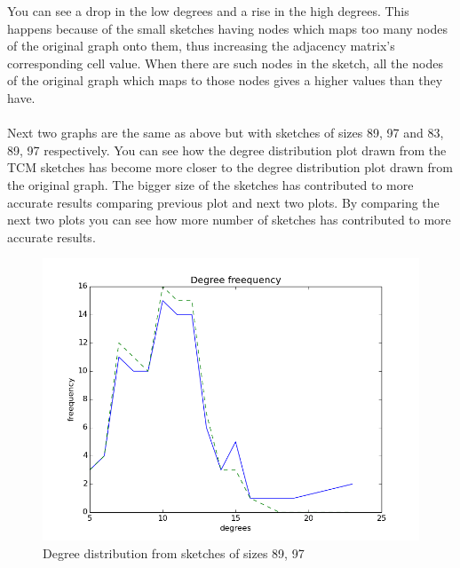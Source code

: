 \documentclass[12pt]{report}
\numberwithin{figure}{section}
\numberwithin{table}{section}
\begin{document}
You can see a drop in the low degrees and a rise in the high degrees. This happens because of the small sketches having nodes which maps too many nodes of the original graph onto them, thus increasing the adjacency matrix’s corresponding cell value. When there are such nodes in the sketch, all the nodes of the original graph which maps to those nodes gives a higher values than they have. 

\paragraph{}

Next two graphs are the same as above but with sketches  of sizes 89, 97 and 83, 89, 97 respectively. You can see how the degree distribution plot drawn from the TCM sketches has become more closer to the degree distribution plot drawn from the original graph. The bigger size of the sketches has contributed to more accurate results comparing previous plot and next two plots. By comparing the next two plots you can see how more number of sketches has contributed to more accurate results.

\begin{figure}[H]
\centering
\includegraphics[scale=0.6]{images/dd2}
\caption{Degree distribution from sketches of sizes 89, 97}
\end{figure}
\end{document}
